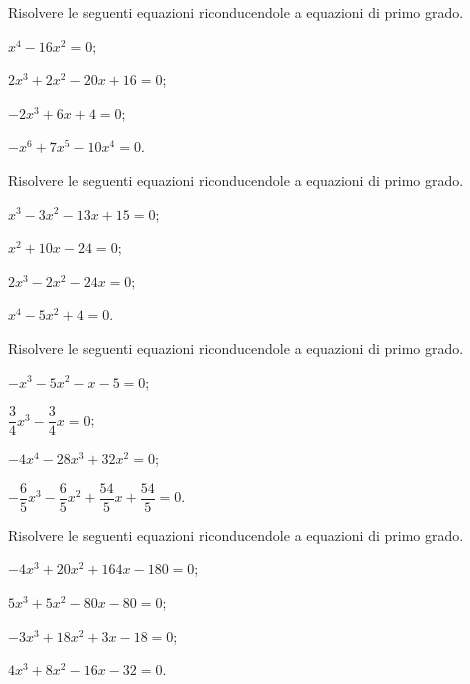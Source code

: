 \begin{esercizio}[\Ast]
\label{ese:17.4}
Risolvere le seguenti equazioni riconducendole a equazioni di primo grado.
\begin{multicols}{2}
\begin{enumeratea}
 \item $x^{4}-16x^{2}=0$;
 \item $2x^{3}+2x^{2}-20x+16=0$;
 \item $-2x^{3}+6x+4=0$;
 \item $-x^{6}+7x^{5}-10x^{4}=0$.
\end{enumeratea}
\end{multicols}
\end{esercizio}

\begin{esercizio}[\Ast]
\label{ese:17.5}
Risolvere le seguenti equazioni riconducendole a equazioni di primo grado.
\begin{multicols}{2}
\begin{enumeratea}
 \item $x^{3}-3x^{2}-13x+15=0$;
 \item $x^{2}+10x-24=0$;
 \item $2x^{3}-2x^{2}-24x=0$;
 \item $x^{4}-5x^{2}+4=0$.
\end{enumeratea}
\end{multicols}
\end{esercizio}

\begin{esercizio}[\Ast]
\label{ese:17.6}
Risolvere le seguenti equazioni riconducendole a equazioni di primo grado.
\begin{multicols}{2}
\begin{enumeratea}
 \item $-x^{3}-5x^{2}-x-5=0$;
 \item $\dfrac{3}{4}x^{3}-\dfrac{3}{4}x=0$;
 \item $-4x^{4}-28x^{3}+32x^{2}=0$;
 \item $-{\dfrac{6}{5}}x^{3}-\dfrac{6}{5}x^{2}+\dfrac{54}{5}x+\dfrac{54}{5}=0$.
\end{enumeratea}
\end{multicols}
\end{esercizio}

\begin{esercizio}[\Ast]
\label{ese:17.7}
Risolvere le seguenti equazioni riconducendole a equazioni di primo grado.
\begin{multicols}{2}
\begin{enumeratea}
 \item $-4x^{3}+20x^{2}+164x-180=0$;
 \item $5x^{3}+5x^{2}-80x-80=0$;
 \item $-3x^{3}+18x^{2}+3x-18=0$;
 \item $4x^{3}+8x^{2}-16x-32=0$.
\end{enumeratea}
\end{multicols}
\end{esercizio}

